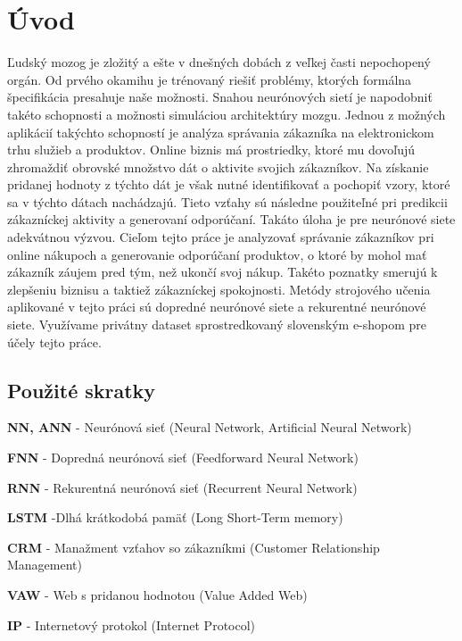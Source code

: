 \newpage
\chapter{Úvod}

Ľudský mozog je zložitý a ešte v dnešných dobách z veľkej časti nepochopený orgán. Od prvého okamihu je trénovaný riešiť problémy, ktorých formálna špecifikácia presahuje naše možnosti. Snahou neurónových sietí je napodobniť takéto schopnosti a možnosti simuláciou architektúry mozgu. \newline\newline
Jednou z možných aplikácií takýchto schopností je analýza správania zákazníka na elektronickom trhu služieb a produktov. Online biznis má prostriedky, ktoré mu dovoľujú zhromaždiť obrovské množstvo dát o aktivite svojich zákazníkov. Na získanie pridanej hodnoty z týchto dát je však nutné identifikovať a pochopiť vzory, ktoré sa v týchto dátach nachádzajú. Tieto vzťahy sú následne použiteľné pri predikcii zákazníckej aktivity a generovaní odporúčaní. Takáto úloha je pre neurónové siete adekvátnou výzvou.
\newline\newline
Cieľom tejto práce je analyzovať správanie zákazníkov pri online nákupoch a generovanie odporúčaní produktov, o ktoré by mohol mať zákazník záujem pred tým, než ukončí svoj nákup. Takéto poznatky smerujú k zlepšeniu biznisu a taktiež zákazníckej spokojnosti. Metódy strojového učenia aplikované v tejto práci sú dopredné neurónové siete a rekurentné neurónové siete. Využívame privátny dataset sprostredkovaný slovenským e-shopom pre účely tejto práce.
\newpage

\section{Použité skratky}
\label{uvod_pouzite_skratky}

\begin{my_itemize}
\item \textbf{NN, ANN} - Neurónová sieť (Neural Network, Artificial Neural Network)
\item \textbf{FNN} - Dopredná neurónová sieť (Feedforward Neural Network)
\item \textbf{RNN} - Rekurentná neurónová sieť (Recurrent Neural Network)
\item \textbf{LSTM} -Dlhá krátkodobá pamäť (Long Short-Term memory)
\item \textbf{CRM} - Manažment vzťahov so zákazníkmi (Customer Relationship Management)
\item \textbf{VAW} - Web s pridanou hodnotou (Value Added Web)
\item \textbf{IP} - Internetový protokol (Internet Protocol)
\end{my_itemize}
